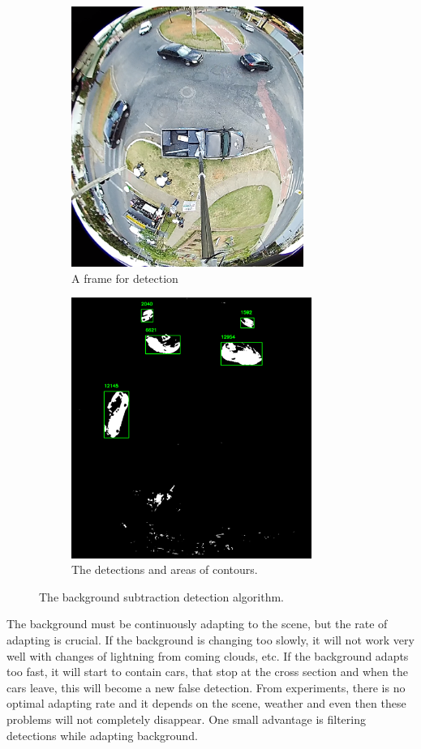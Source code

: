 \documentclass[a4paper,12pt,titlepage, twoside]{article}
\numberwithin{figure}{section}
\begin{document}
\begin{figure}
    \begin{subfigure}[Sample1]{0.5\linewidth}
    	\includegraphics[height=85mm]{fig/frame_cropped.png} 
        \caption{A frame for detection}
        \label{fig:frame_for_detection}   
    \end{subfigure}
    \qquad
    \begin{subfigure}[Sample1]{0.5\linewidth} 
    	\includegraphics[height=85mm]{fig/mask_area.png}
        \caption{The detections and areas of contours.}   
        \label{fig:mask_area}
    \end{subfigure} 
    \caption{The background subtraction detection algorithm.}
\end{figure}

The background must be continuously adapting to the scene, but the rate of adapting is crucial. If the background is changing too slowly, it will not work very well with changes of lightning from coming clouds, etc. If the background adapts too fast, it will start to contain cars, that stop at the cross section and when the cars leave, this will become a new false detection. From experiments, there is no optimal adapting rate and it depends on the scene, weather and even then these problems will not completely disappear. One small advantage is filtering detections while adapting background.
\end{document}
